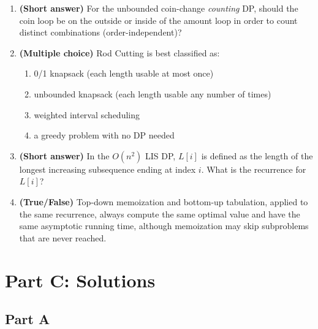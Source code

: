 \documentclass[11pt]{article}
\begin{document}
\begin{enumerate}[label=\textbf{B\arabic*.}, leftmargin=2.2em]
\item \textbf{(Short answer)} For the unbounded coin-change \emph{counting} DP, should the
coin loop be on the outside or inside of the amount loop in order to count distinct
combinations (order-independent)?

\item \textbf{(Multiple choice)} Rod Cutting is best classified as:
\begin{enumerate}[label=(\alph*)]
    \item 0/1 knapsack (each length usable at most once)
    \item unbounded knapsack (each length usable any number of times)
    \item weighted interval scheduling
    \item a greedy problem with no DP needed
\end{enumerate}

\item \textbf{(Short answer)} In the $O(n^2)$ LIS DP, $L[i]$ is defined as the length of
the longest increasing subsequence ending at index $i$. What is the recurrence for $L[i]$?

\item \textbf{(True/False)} Top-down memoization and bottom-up tabulation, applied to the
same recurrence, always compute the same optimal value and have the same asymptotic running
time, although memoization may skip subproblems that are never reached.

\end{enumerate}

\newpage
\section*{Part C: Solutions}

\subsection*{Part A}
\end{document}
